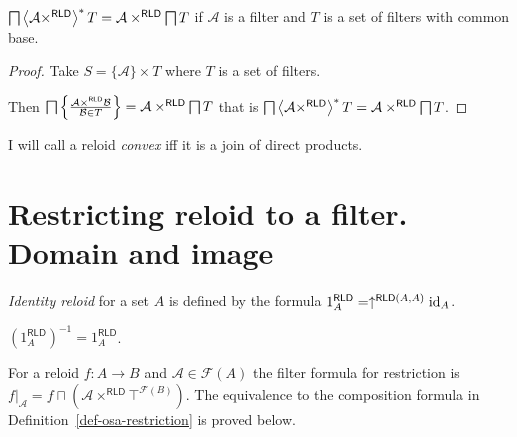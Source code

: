 \begin{cor}
$\bigsqcap\left\langle \mathcal{A}\times^{\mathsf{RLD}}\right\rangle ^{\ast}T=\mathcal{A}\times^{\mathsf{RLD}}\bigsqcap T$
if $\mathcal{A}$ is a filter and $T$ is a set of filters with common
base.\end{cor}
\begin{proof}
Take $S=\{\mathcal{A}\}\times T$ where $T$ is a set of filters.

Then $\bigsqcap\left\{ \frac{\mathcal{A}\times^{\mathsf{RLD}}\mathcal{B}}{\mathcal{B}\in T}\right\}=\mathcal{A}\times^{\mathsf{RLD}}\bigsqcap T$
that is $\bigsqcap\left\langle \mathcal{A}\times^{\mathsf{RLD}}\right\rangle ^{\ast}T=\mathcal{A}\times^{\mathsf{RLD}}\bigsqcap T$.\end{proof}
\begin{defn}
I will call a reloid \emph{convex} iff it is
a join of direct products.
\end{defn}

\section{Restricting reloid to a filter. Domain and image}
\begin{defn}
\emph{Identity reloid} for a set $A$ is defined
by the formula $1_{A}^{\mathsf{RLD}}=\uparrow^{\mathsf{RLD}(A,A)}{\operatorname{id}}_{A}$.\end{defn}
\begin{obvious}
$(1_{A}^{\mathsf{RLD}})^{-1}=1_{A}^{\mathsf{RLD}}$.\end{obvious}
\begin{defn}
For a reloid $f:A\to B$ and
$\mathcal A\in\mathscr F(A)$ the filter formula for restriction is
$f|_{\mathcal A}=f\sqcap(\mathcal A\times^{\mathsf{RLD}}\top^{\mathscr F(B)})$.
The equivalence to the composition formula in
Definition~\ref{def-osa-restriction} is proved below.
\end{defn}


